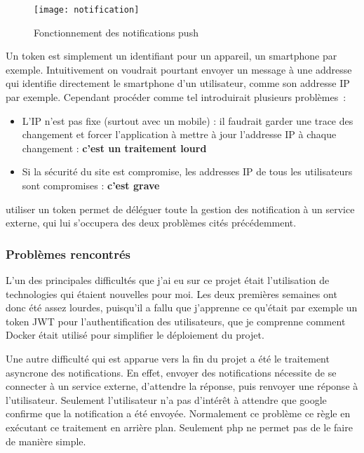 \documentclass[../rapport.tex]{subfiles}
\begin{document}
        \begin{figure}
            \centering
            \texttt{[image: notification]}
            \caption{Fonctionnement des notifications push}
            \label{fig:notification}
        \end{figure}

        Un token est simplement un identifiant pour un appareil, un smartphone par exemple. Intuitivement on voudrait pourtant envoyer un message à une addresse qui identifie directement le smartphone d'un utilisateur, comme son addresse IP par exemple. Cependant procéder comme tel introduirait plusieurs problèmes~:
    \begin{itemize}
        \item L'IP n'est pas fixe (surtout avec un mobile) : il faudrait garder une trace des changement
            et forcer l'application à mettre à jour l'addresse IP à chaque changement : \textbf{c'est un traitement lourd}
        \item Si la sécurité du site est compromise, les addresses IP de tous les utilisateurs sont compromises : \textbf{c'est grave}
    \end{itemize}
        utiliser un token permet de déléguer toute la gestion des notification à un service externe, qui lui s'occupera des deux problèmes
        cités précédemment.


        \subsubsection{Problèmes rencontrés}
        L'un des principales difficultés que j'ai eu sur ce projet était l'utilisation de technologies qui étaient nouvelles pour moi.
        Les deux premières semaines ont donc été assez lourdes, puisqu'il a fallu que j'apprenne ce qu'était par exemple un token JWT pour l'authentification des utilisateurs, que je comprenne comment Docker était utilisé pour simplifier le déploiement du projet.

        Une autre difficulté qui est apparue vers la fin du projet a été le traitement asyncrone des notifications. En effet, envoyer des notifications nécessite de se connecter à un service externe, d'attendre la réponse, puis renvoyer une réponse à l'utilisateur. Seulement l'utilisateur n'a pas d'intérêt à attendre que google confirme que la notification a été envoyée. Normalement ce problème ce règle en exécutant ce traitement en arrière plan. Seulement php ne permet pas de le faire de manière simple.
\end{document}

